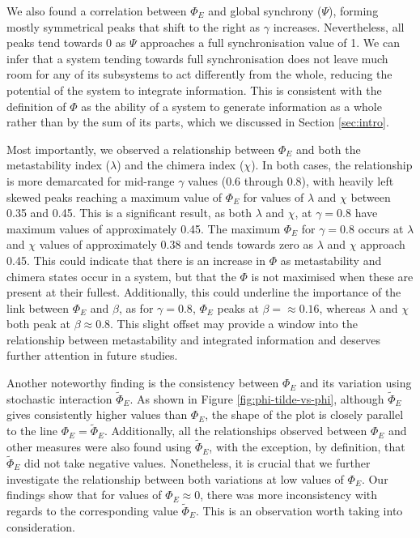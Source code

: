 \documentclass[a4paper,11pt]{article}
\begin{document}
We also found a correlation between $\Phi_E$ and global synchrony ($\Psi$), forming mostly symmetrical peaks that shift to the right as $\gamma$ increases. Nevertheless, all peaks tend towards 0 as $\Psi$ approaches a full synchronisation value of 1. We can infer that a system tending towards full synchronisation does not leave much room for any of its subsystems to act differently from the whole, reducing the potential of the system to integrate information. This is consistent with the definition of $\Phi$ as the ability of a system to generate information as a whole rather than by the sum of its parts, which we discussed in Section \ref{sec:intro}.

Most importantly, we observed a relationship between $\Phi_E$ and both the metastability index ($\lambda$) and the chimera index ($\chi$). In both cases, the relationship is more demarcated for mid-range $\gamma$ values (0.6 through 0.8), with heavily left skewed peaks reaching a maximum value of $\Phi_E$ for values of $\lambda$ and $\chi$ between 0.35 and 0.45. This is a significant result, as both $\lambda$ and $\chi$, at $\gamma = 0.8$ have maximum values of approximately 0.45. The maximum $\Phi_E$ for $\gamma = 0.8$ occurs at $\lambda$ and $\chi$ values of approximately 0.38 and tends towards zero as $\lambda$ and $\chi$ approach 0.45. This could indicate that there is an increase in $\Phi$ as metastability and chimera states occur in a system, but that the $\Phi$ is not maximised when these are present at their fullest. Additionally, this could underline the importance of the link between $\Phi_E$ and $\beta$, as for $\gamma = 0.8$, $\Phi_E$ peaks at $\beta =\approx 0.16$, whereas $\lambda$ and $\chi$ both peak at $\beta \approx 0.8$. This slight offset may provide a window into the relationship between metastability and integrated information and deserves further attention in future studies.

Another noteworthy finding is the consistency between $\Phi_E$ and its variation using stochastic interaction $\widetilde{\Phi}_E$. As shown in Figure \ref{fig:phi-tilde-vs-phi}, although $\widetilde{\Phi}_{E}$ gives consistently higher values than $\Phi_E$, the shape of the plot is closely parallel to the line $\Phi_E = \widetilde{\Phi}_{E}$. Additionally, all the relationships observed between $\Phi_E$ and other measures were also found using $\widetilde{\Phi}_{E}$, with the exception, by definition, that $\widetilde{\Phi}_{E}$ did not take negative values. Nonetheless, it is crucial that we further investigate the relationship between both variations at low values of $\Phi_E$. Our findings show that for values of $\Phi_E \approx 0$, there was more inconsistency with regards to the corresponding value $\widetilde{\Phi}_{E}$. This is an observation worth taking into consideration.
\end{document}
